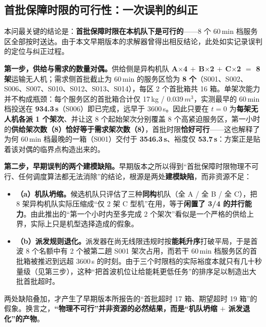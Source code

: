 \subsection{首批保障时限的可行性：一次误判的纠正}

本问最关键的结论是：\textbf{首批保障时限在本机队下是可行的}——8 个 60\,min 档服务区全部按时送达。由于本文早期版本的求解器曾得出相反结论，此处如实记录误判的定位与纠正过程。

\textbf{第一步，供给与需求的数量对偶。}供给侧是异构机队 \textbf{A$\times$4 $+$ B$\times$2 $+$ C$\times$2 $=$ 8 架}运输无人机；需求侧首批截止为 60\,min 的服务区恰为 \textbf{8 个}（S001、S002、S006、S007、S010、S012、S013、S014），每区 2 个首批箱共 16 箱。单架次能力并不构成瓶颈：每个服务区的首批箱合计仅 17\,kg / 0.039\,$m^{3}$，实测最早的 60\,min 档投送在 \textbf{934.3\,s}（S006）即已完成，远早于 3600\,s。因此只要在 $t=0$ 为\textbf{每架无人机各派 1 个架次}、并让这 8 个起始架次分别覆盖 8 个高紧迫服务区，第一小时的\textbf{供给架次数（8）恰好等于需求架次数（8）}，首批时限\textbf{恰好可行}——这也解释了为何 60\,min 档最晚的一箱（S001）交付于 \textbf{3546.3\,s}、裕度仅 \textbf{53.7\,s}：方案正是贴着该对偶的临界点构造出来的。

\textbf{第二步，早期误判的两个建模缺陷。}早期版本之所以得到“首批保障时限物理不可行、任何调度算法都无法消除”的结论，根源是两处\textbf{建模缺陷}，而非资源不足：

\begin{itemize}[leftmargin=2em]
	\item \textbf{（a）机队坍缩。}候选机队只评估了三种\textbf{同构}机队（全 A / 全 B / 全 C），把 8 架异构机队实际压缩成“仅 2 架 C 型机”在用，等于\textbf{闲置了 3/4 的并行能力}。由此推出的“第一个小时内至多完成 2 个架次”看似是一个严格的供给上界，实际上只是机型选择造成的假象。
	\item \textbf{（b）派发规则退化。}派发器在尚无线限违规时按\textbf{能耗升序}打破平局，于是首波 8 个名额中有 2 个被第二趟 S001 架次占用，而若干 60\,min 档服务区的首批箱被推迟到远超 3600\,s 的时刻。由于三个时限档的实际裕度本就只有几十秒量级（见第三步），这种“把首波机位让给能耗更低任务”的排序足以制造出大批首批超时。
\end{itemize}

两处缺陷叠加，才产生了早期版本所报告的“首批超时 17 箱、期望超时 19 箱”的假象。换言之，\textbf{“物理不可行”并非资源的必然结果，而是“机队坍缩 $+$ 派发退化”的产物}。

